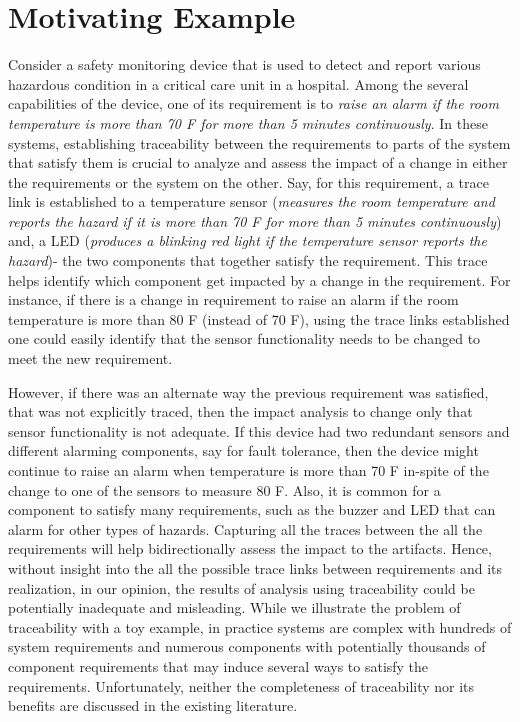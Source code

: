 \section{Motivating Example}

Consider a safety monitoring device that is used to detect and report various hazardous condition in a critical care unit in a hospital. Among the several capabilities of the device, one of its requirement is to \emph{raise an alarm if the room temperature is more than 70 F for more than 5 minutes continuously}. In these systems, establishing traceability between the requirements to parts of the system that satisfy them is crucial to analyze and assess the impact of a change in either the requirements or the system on the other. Say, for this requirement, a trace link is established to a temperature sensor (\emph{measures the room temperature and reports the hazard if it is more than 70 F for more than 5 minutes continuously}) and, a LED (\emph{produces a blinking red light if the temperature sensor reports the hazard})- the two components that together satisfy the requirement. This trace helps identify which component get impacted by a change in the requirement. For instance, if there is a change in requirement to raise an alarm if the room temperature is more than 80 F (instead of 70 F), using the trace links established one could easily identify that the sensor functionality needs to be changed to meet the new requirement.
 
However, if there was an alternate way the previous requirement was satisfied, that was not explicitly traced, then the impact analysis to change only that sensor functionality is not adequate. If this device had two redundant sensors and different alarming components, say for fault tolerance, then the device might continue to raise an alarm when temperature is more than 70 F in-spite of the change to one of the sensors to measure 80 F. Also, it is common for a component to satisfy many requirements, such as the buzzer and LED that can alarm for other types of hazards. Capturing all the traces between the all the requirements will help bidirectionally assess the impact to the artifacts. Hence, without insight into the all the possible trace links between requirements and its realization, in our opinion, the results of analysis using traceability could be potentially inadequate and misleading. While we illustrate the problem of traceability with a toy example, in practice systems are complex with hundreds of system requirements and numerous components with potentially thousands of component requirements that may induce several ways to satisfy the requirements.  Unfortunately, neither the completeness of traceability nor its benefits are discussed in the existing literature.

